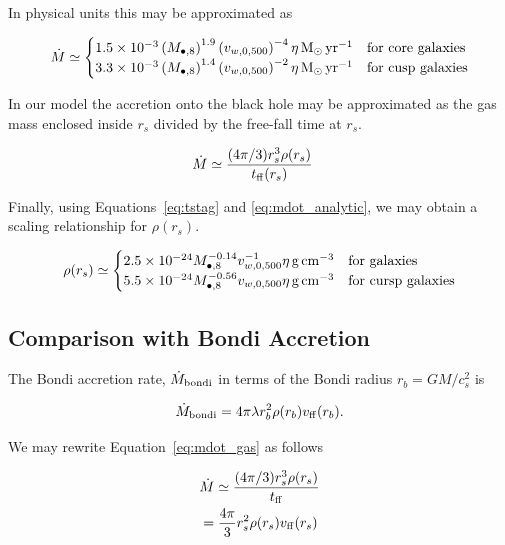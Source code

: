 \documentclass[usenatbib,fleqn]{mn2e}
\newcommand{\Mdotb}{\dot{M}_{\rm bondi}}
\newcommand{\rs}{r_s}
\newcommand{\rb}{r_b}
\newcommand{\Mbheight}{M_{\bullet,8}}
\newcommand{\ff}{\rm ff}
\newcommand{\vwOFH}{v_{w,0,500}}
\newcommand{\pyear}{{\rm yr}^{-1}}
\begin{document}
In physical units this may be approximated as 

\begin{align}
\dot{M}\simeq
\begin{cases}
   1.5 \times 10^{-3}  \left(\Mbheight\right)^{1.9}
   \left(\vwOFH\right)^{-4} \eta \Msun \, \pyear& \text{for core galaxies} \\
   3.3 \times 10^{-3} \left(\Mbheight\right)^{1.4}
   \left(\vwOFH\right)^{-2} \eta \Msun \, \pyear  & \text{for cusp
     galaxies} 
 \end{cases}
\label{eq:mdot_analytic}
\end{align}

In our model the accretion onto the black hole may be approximated as
the gas mass enclosed inside $\rs$ divided by the free-fall time at $\rs$.

\begin{align}
&\dot{M}\simeq\frac{(4 \pi/3) \rs^3 \rho(\rs)}{t_{\ff}(\rs)}
\label{eq:mdot_gas}
\end{align}

Finally, using Equations~\ref{eq:tstag} and \ref{eq:mdot_analytic}, we
may obtain a scaling relationship for $\rho(\rs)$. 

\begin{align}
\rho(\rs)\simeq
\begin{cases}
2.5 \times 10^{-24} \Mbheight^{-0.14} \vwOFH^{-1} \eta \, {\rm g \, cm^{-3}}& \text{for   galaxies}\\
5.5 \times 10^{-24}  \Mbheight^{-0.56} \vwOFH    \eta \, {\rm g \,cm^{-3}} & \text{for cursp galaxies}
\end{cases}
\label{eq:rhors}
\end{align}


\subsection{Comparison with Bondi Accretion}
The Bondi accretion rate, $\Mdotb$ in terms of the Bondi radius $\rb=G
M/c_s^2$ is 

\begin{align}
\Mdotb=4\pi \lambda r_b^2 \rho(r_b) v_{\rm ff}(r_b).
\end{align}

We may rewrite Equation~\ref{eq:mdot_gas} as follows

\begin{align}
&\dot{M}\simeq\frac{(4 \pi/3) \rs^3 \rho(\rs)}{t_{\ff}}\\
&=\frac{4 \pi}{3} \rs^2 \rho(\rs) v_{\ff}(\rs)
\end{align}
\end{document}
